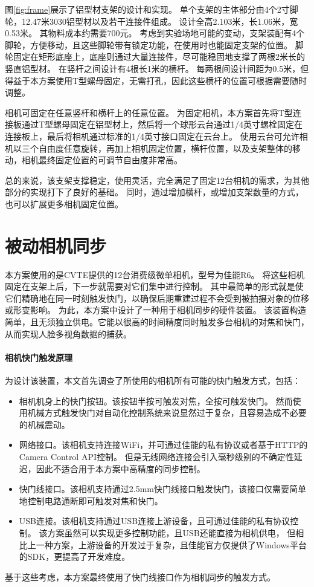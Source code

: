 图\ref{fig:frame}展示了铝型材支架的设计和实现。
单个支架的主体部分由4个2寸脚轮，12.47米3030铝型材以及若干连接件组成。
设计全高2.103米，长1.06米，宽0.53米。
其物料成本约需要700元。
考虑到实验场地可能的变动，支架装配有4个脚轮，方便移动，且这些脚轮带有锁定功能，在使用时也能固定支架的位置。
脚轮固定在矩形底座上，底座则通过大量连接件，尽可能稳固地支撑了两根2米长的竖直铝型材。
在竖杆之间设计有4根长1米的横杆。
每两根间设计间距为0.5米，但得益于本方案使用T型螺母固定，无需打孔，因此这些横杆的位置可根据需要随时调整。

相机可固定在任意竖杆和横杆上的任意位置。
为固定相机，本方案首先将T型连接板通过T型螺母固定在铝型材上，然后将一个球形云台通过1/4英寸螺栓固定在连接板上，最后将相机通过标准的1/4英寸接口固定在云台上。
使用云台可允许相机以三个自由度任意旋转，再加上相机固定位置，横杆位置，以及支架整体的移动，相机最终固定位置的可调节自由度非常高。

总的来说，该支架支撑稳定，使用灵活，完全满足了固定12台相机的需求，为其他部分的实现打下了良好的基础。
同时，通过增加横杆，或增加支架数量的方式，也可以扩展更多相机固定位置。

\section{被动相机同步}
\label{sec:passive_sync}

本方案使用的是CVTE提供的12台消费级微单相机，型号为佳能R6。
将这些相机固定在支架上后，下一步就需要对它们集中进行控制。
其中最简单的形式就是使它们精确地在同一时刻触发快门，以确保后期重建过程不会受到被拍摄对象的位移或形变影响。
为此，本方案中设计了一种用于相机同步的硬件装置。
该装置构造简单，且无须独立供电。它能以很高的时间精度同时触发多台相机的对焦和快门，从而实现人脸多视角数据的捕获。

\paragraph{相机快门触发原理}

为设计该装置，本文首先调查了所使用的相机所有可能的快门触发方式，包括：
\begin{itemize}
\item 相机机身上的快门按钮。该按钮半按可触发对焦，全按可触发快门。
然而使用机械方式触发快门对自动化控制系统来说显然过于复杂，且容易造成不必要的机械震动。
\item 网络接口。该相机支持连接WiFi，并可通过佳能的私有协议或者基于HTTP的Camera Control API控制。
但是无线网络连接会引入毫秒级别的不确定性延迟，因此不适合用于本方案中高精度的同步控制。
\item 快门线接口。该相机支持通过2.5mm快门线接口触发快门，该接口仅需要简单地控制电路通断即可触发对焦和快门。
\item USB连接。该相机支持通过USB连接上游设备，且可通过佳能的私有协议控制。
该方案虽然可以实现更多控制功能，且USB还能直接为相机供电，
但相比上一种方案，上游设备的开发过于复杂，且佳能官方仅提供了Windows平台的SDK，更提高了开发难度。
\end{itemize}
基于这些考虑，本方案最终使用了快门线接口作为相机同步的触发方式。

